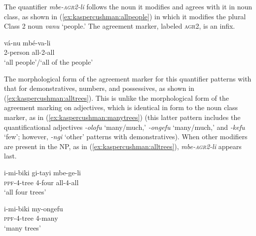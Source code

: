 \documentclass[output=paper,modfonts,nonflat]{langsci/langscibook}
\begin{document}
 The quantifier \emph{mbe-\textsc{agr2}-li} follows the noun it modifies and agrees with it in noun class, as shown in (\ref{ex:kaspercushman:allpeople}) in which it modifies the plural Class 2 noun \textit{vanu} `people.' The agreement marker, labeled \textsc{agr2}, is an infix.  

\begin{exe}
\ex \label{ex:kaspercushman:allpeople}
\gll vá-nu mbé-va-li \\
2-person all-2-all \\
\glt `all people'/`all of the people'\footnotemark \\

\end{exe}

The morphological form of the agreement marker for this quantifier patterns with that for demonstratives, numbers, and possessives, as shown in (\ref{ex:kaspercushman:alltrees}).  This is unlike the morphological form of the agreement marking on adjectives, which is identical in form to the noun class marker, as in (\ref{ex:kaspercushman:manytrees}) (this latter pattern includes the quantificational adjectives \textit{-olofu} `many/much,' \textit{-ongefu} `many/much,' and \textit{-kefu} `few'; however, \textit{-ngi} `other' patterns with demonstratives). When other modifiers are present in the NP, as in (\ref{ex:kaspercushman:alltrees}),   \textit{mbe-\textsc{agr2}-li} appears last.


\begin{exe}

\ex\begin{xlist}

\ex 
\gll i-mi-biki gi-tayi mbe-ge-li\\ 
\textsc{ppf}-4-tree 4-four all-4-all\\
\glt `all four trees' \\ \label{ex:kaspercushman:alltrees}

\ex 
\gll i-mi-biki my-ongefu\\
\textsc{ppf}-4-tree 4-many \\
\glt `many trees' \label{ex:kaspercushman:manytrees}

\end{xlist}

\end{exe}
\end{document}
